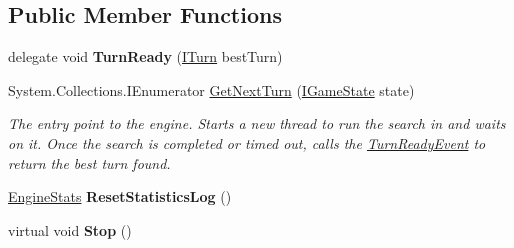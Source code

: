 \subsection*{Public Member Functions}
\begin{DoxyCompactItemize}
\item 
\hypertarget{class_universal_turn_based_a_i_1_1_turn_engine_a8e529eaca1c650dc031b151b381242b5}{}delegate void {\bfseries Turn\+Ready} (\hyperlink{interface_universal_turn_based_a_i_1_1_i_turn}{I\+Turn} best\+Turn)\label{class_universal_turn_based_a_i_1_1_turn_engine_a8e529eaca1c650dc031b151b381242b5}

\item 
System.\+Collections.\+I\+Enumerator \hyperlink{class_universal_turn_based_a_i_1_1_turn_engine_ad1a07e70064e2f188b65a783aa49cd8a}{Get\+Next\+Turn} (\hyperlink{interface_universal_turn_based_a_i_1_1_i_game_state}{I\+Game\+State} state)
\begin{DoxyCompactList}\small\item\em The entry point to the engine. Starts a new thread to run the search in and waits on it. Once the search is completed or timed out, calls the \hyperlink{class_universal_turn_based_a_i_1_1_turn_engine_af10115494121382d2966a8fc9fe4c9a0}{Turn\+Ready\+Event} to return the best turn found. \end{DoxyCompactList}\item 
\hypertarget{class_universal_turn_based_a_i_1_1_turn_engine_a210fed5125af320ef0a9634305bca467}{}\hyperlink{class_universal_turn_based_a_i_1_1_engine_stats}{Engine\+Stats} {\bfseries Reset\+Statistics\+Log} ()\label{class_universal_turn_based_a_i_1_1_turn_engine_a210fed5125af320ef0a9634305bca467}

\item 
\hypertarget{class_universal_turn_based_a_i_1_1_turn_engine_a2a1210eb5816e1335f80d7a05efdafbf}{}virtual void {\bfseries Stop} ()\label{class_universal_turn_based_a_i_1_1_turn_engine_a2a1210eb5816e1335f80d7a05efdafbf}

\end{DoxyCompactItemize}
